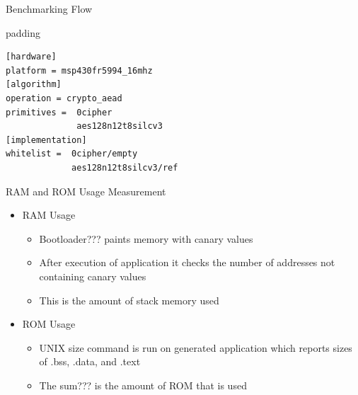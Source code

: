 \documentclass[xcolor=pdftex,dvipsnames,table,final]{beamer}
\begin{document}
\begin{frame}[fragile]{}
\begin{columns}[t, totalwidth=\textwidth]
\begin{column}{.675\linewidth}
\begin{columns}
\begin{column}{.473\linewidth}
\begin{block}{Benchmarking Flow}
\begin{center}
\begin{minipage}{0.9\linewidth}
\begin{beamercolorbox}[rounded=true]{padding}
               \footnotesize%
              \begin{lstlisting}
[hardware]
platform = msp430fr5994_16mhz
[algorithm]
operation = crypto_aead
primitives =  0cipher
              aes128n12t8silcv3
[implementation]
whitelist =  0cipher/empty
             aes128n12t8silcv3/ref
              \end{lstlisting}
            \end{beamercolorbox}
            \end{minipage}%
          \end{center}
      \end{block}
     
      \begin{block}{RAM and ROM Usage Measurement}
        \begin{itemize}
          \item RAM Usage
            \begin{itemize}
              \item {\color{red}Bootloader???} paints memory with canary values
              \item After execution of application it checks
                    the number of addresses not containing canary values
              \item This is the amount of stack memory used
            \end{itemize}
          \item ROM Usage
            \begin{itemize}
              \item UNIX size command is run on generated application which
                    reports sizes of .bss, .data, and .text
              \item The {\color{red}sum???} is the amount of ROM that is used
            \end{itemize}
        \end{itemize}

      \end{block}


\end{column}
\end{columns}
\end{column}
\end{columns}
\end{frame}
\end{document}
